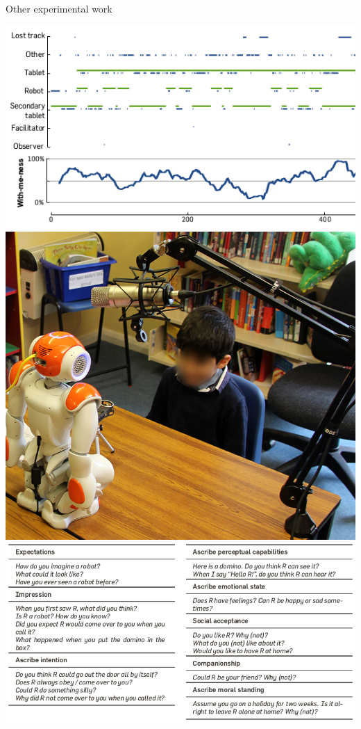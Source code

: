 \documentclass[compress]{beamer}
\begin{document}
\begin{frame}{Other experimental work}
            \hyperlink{withmeness}{\includegraphics[height=0.2\paperheight]{withmeness/withmeness}}
            \hspace{0.5em}
            \hyperlink{asr}{\includegraphics[height=0.2\paperheight]{speech-reco/record_img}}
            \hspace{0.5em}
            \hyperlink{constructs}{\includegraphics[height=0.2\paperheight]{ranger/questionnaire}}

\end{frame}
\end{document}
